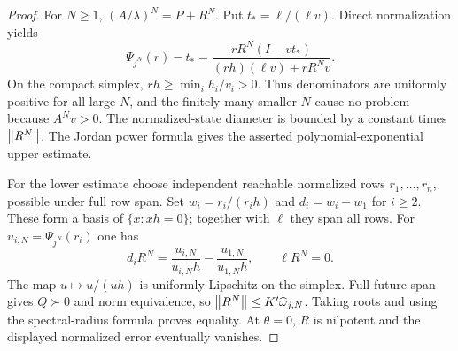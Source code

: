 \begin{proof}
For $N\ge1$, $(A/\lambda)^N=P+R^N$. Put $t_*=\ell/(\ell v)$. Direct normalization yields
\[
 \Psi_{j^N}(r)-t_*=
 \frac{rR^N(I-vt_*)}{(rh)(\ell v)+rR^Nv}.
\]
On the compact simplex, $rh\ge\min_i h_i/v_i>0$. Thus denominators are uniformly positive for all large $N$, and the finitely many smaller $N$ cause no problem because $A^Nv>0$. The normalized-state diameter is bounded by a constant times $\left\lVert R^N\right\rVert$. The Jordan power formula gives the asserted polynomial-exponential upper estimate.

For the lower estimate choose independent reachable normalized rows $r_1,\ldots,r_n$, possible under full row span. Set $w_i=r_i/(r_ih)$ and $d_i=w_i-w_1$ for $i\ge2$. These form a basis of $\{x:xh=0\}$; together with $\ell$ they span all rows. For $u_{i,N}=\Psi_{j^N}(r_i)$ one has
\[
 d_iR^N=\frac{u_{i,N}}{u_{i,N}h}-\frac{u_{1,N}}{u_{1,N}h},\qquad\ell R^N=0.
\]
The map $u\mapsto u/(uh)$ is uniformly Lipschitz on the simplex. Full future span gives $Q\succ0$ and norm equivalence, so $\left\lVert R^N\right\rVert\le K'\widehat\omega_{j,N}$. Taking roots and using the spectral-radius formula proves equality. At $\theta=0$, $R$ is nilpotent and the displayed normalized error eventually vanishes.
\end{proof}
